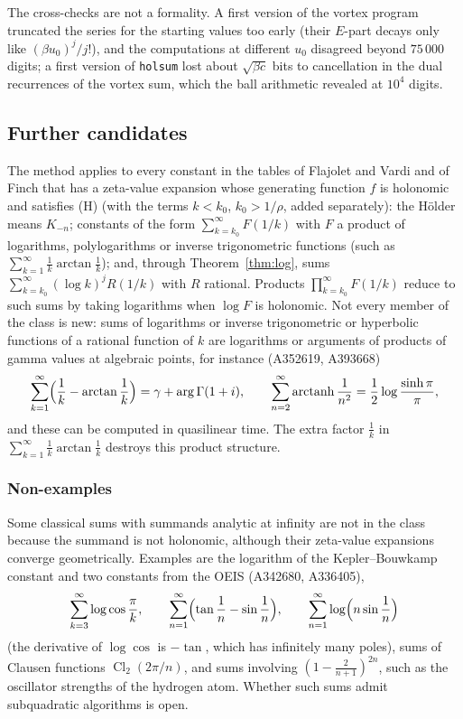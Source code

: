 \documentclass[11pt,reqno]{amsart}
\theoremstyle{definition}
\theoremstyle{remark}
\newcommand{\arctanh}{\operatorname{arctanh}}
\begin{document}
The cross-checks are not a formality. A first version of the vortex program truncated the series for the starting
values too early (their $E$-part decays only like $(\beta u_0)^j/j!$), and the computations at different $u_0$ disagreed
beyond $75\,000$ digits; a first version of \texttt{holsum} lost about $\sqrt{\beta c}$ bits to cancellation in the
dual recurrences of the vortex sum, which the ball arithmetic revealed at $10^4$ digits.

\subsection{Further candidates}
The method applies to every constant in the tables of Flajolet and Vardi \cite{FV96} and of Finch \cite{Fin03}
that has a zeta-value expansion whose generating function $f$ is holonomic and satisfies (H) (with the terms $k < k_0$, $k_0 > 1/\rho$,
added separately): the H\"older means $K_{-n}$; constants of the form
$\sum_{k=k_0}^{\infty} F(1/k)$ with $F$ a product of logarithms, polylogarithms or inverse trigonometric functions (such as
$\sum_{k=1}^{\infty} \frac1k\arctan\frac1k$); and, through Theorem~\ref{thm:log}, sums $\sum_{k=k_0}^{\infty} (\log k)^j R(1/k)$ with $R$ rational.
Products $\prod_{k=k_0}^{\infty} F(1/k)$ reduce to such sums by taking logarithms when $\log F$ is holonomic.
Not every member of the class is new: sums of logarithms or inverse trigonometric or hyperbolic functions of a
rational function of $k$ are logarithms or arguments of products of gamma values at algebraic points, for instance
(A352619, A393668)
\[
  \sum_{k=1}^{\infty}\Bigl(\frac1k - \arctan\frac1k\Bigr) = \gamma + \arg\Gamma(1+i), \qquad
  \sum_{n=2}^{\infty}\arctanh\frac1{n^2} = \frac12\log\frac{\sinh\pi}{\pi},
\]
and these can be computed in quasilinear time.
The extra factor $\frac1k$ in $\sum_{k=1}^{\infty}\frac1k\arctan\frac1k$ destroys this product structure.

\subsubsection{Non-examples} Some classical sums with summands analytic at infinity are not in the class because the summand
is not holonomic, although their zeta-value expansions converge geometrically. Examples are the logarithm of the
Kepler--Bouwkamp constant and two constants from the OEIS (A342680, A336405),
\[
  \sum_{k=3}^{\infty}\log\cos\frac\pi k, \qquad \sum_{n=1}^{\infty}\Bigl(\tan\frac1n - \sin\frac1n\Bigr), \qquad
  \sum_{n=1}^{\infty}\log\Bigl(n\sin\frac1n\Bigr)
\]
(the derivative of $\log\cos$ is $-\tan$, which has infinitely many poles), sums of Clausen
functions $\operatorname{Cl}_2(2\pi/n)$, and sums involving $(1 - \frac2{n+1})^{2n}$, such as the oscillator strengths of the
hydrogen atom. Whether such sums admit subquadratic algorithms is open.
\end{document}
